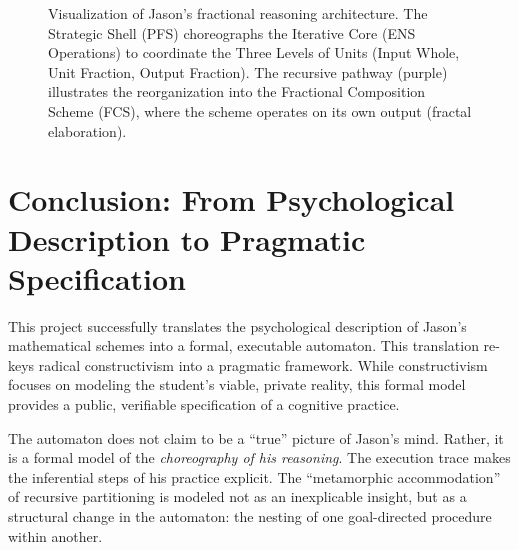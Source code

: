 \documentclass[12pt]{book}
\begin{document}
\begin{figure}[H]
{%
    }
    \caption{Visualization of Jason's fractional reasoning architecture. The Strategic Shell (PFS) choreographs the Iterative Core (ENS Operations) to coordinate the Three Levels of Units (Input Whole, Unit Fraction, Output Fraction). The recursive pathway (purple) illustrates the reorganization into the Fractional Composition Scheme (FCS), where the scheme operates on its own output (fractal elaboration).}
    \label{fig:jason-automata-coordination}
\end{figure}

\section{Conclusion: From Psychological Description to Pragmatic Specification}
This project successfully translates the psychological description of Jason's mathematical schemes into a formal, executable automaton. This translation re-keys radical constructivism into a pragmatic framework. While constructivism focuses on modeling the student's viable, private reality, this formal model provides a public, verifiable specification of a cognitive practice.

The automaton does not claim to be a ``true'' picture of Jason's mind. Rather, it is a formal model of the \textit{choreography of his reasoning}. The execution trace makes the inferential steps of his practice explicit. The ``metamorphic accommodation'' of recursive partitioning is modeled not as an inexplicable insight, but as a structural change in the automaton: the nesting of one goal-directed procedure within another.
\end{document}

